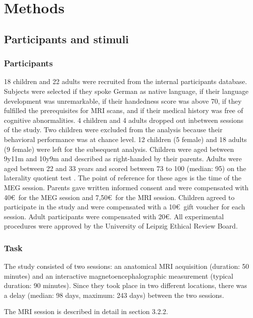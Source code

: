 
\chapter{Methods}\label{methods}

\section {Participants and stimuli}

\subsection{Participants}

18 children and 22 adults were recruited from the internal participants database.
Subjects were selected if they spoke German as native language, if their language development was unremarkable, if their handedness score was above 70, if they fulfilled the prerequisites for MRI scans, and if their medical history was free of cognitive abnormalities.
4 children and 4 adults dropped out inbetween sessions of the study.
Two children were excluded from the analysis because their behavioral performance was at chance level.
12 children (5 female) and 18 adults (9 female) were left for the subsequent analysis.
Children were aged between 9y11m and 10y9m and described as right-handed by their parents.
Adults were aged between 22 and 33 years and scored between 73 to 100 (median: 95) on the laterality quotient test \cite{3.1.LQ}.
The point of reference for these ages is the time of the MEG session.
Parents gave written informed consent and were compensated with 40\euro \ for the MEG session and 7,50\euro \ for the MRI session.
Children agreed to participate in the study and were compensated with a 10\euro \ gift voucher for each session.
Adult participants were compensated with 20\euro.
All experimental procedures were approved by the University of Leipzig Ethical Review Board.


\subsection{Task}

The study consisted of two sessions: an anatomical MRI acquisition (duration: 50 minutes) and an interactive magnetoencephalographic measurement (typical duration: 90 minutes).
Since they took place in two different locations, there was a delay (median: 98 days, maximum: 243 days) between the two sessions.

The MRI session is described in detail in section 3.2.2.

